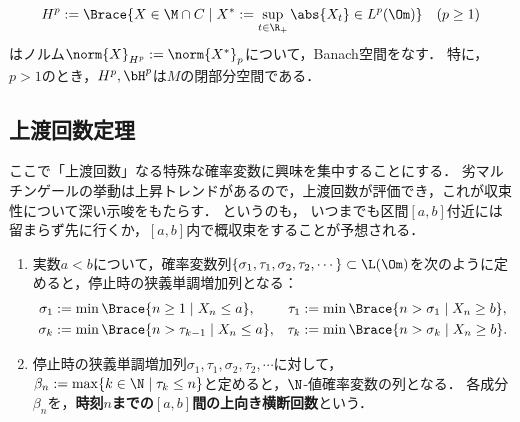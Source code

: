 \documentclass[uplatex,dvipdfmx]{jsreport}
\begin{document}
\begin{corollary}[可積分なマルチンゲールのなすBanach空間]\label{cor-the-space-Hp}
    \[H^p:=\Brace{X\in\M\cap C\mid X^*:=\sup_{t\in\R_+}\abs{X_t}\in L^p(\Om)}\quad(p\ge 1)\]
    はノルム$\norm{X}_{H^p}:=\norm{X^*}_p$について，Banach空間をなす．
    特に，$p>1$のとき，$H^p,\bH^p$は$M$の閉部分空間である．
\end{corollary}

\subsection{上渡回数定理}

\begin{tcolorbox}[colframe=ForestGreen, colback=ForestGreen!10!white,breakable,colbacktitle=ForestGreen!40!white,coltitle=black,fonttitle=\bfseries\sffamily,
    title=]
    ここで「上渡回数」なる特殊な確率変数に興味を集中することにする．
    劣マルチンゲールの挙動は上昇トレンドがあるので，上渡回数が評価でき，これが収束性について深い示唆をもたらす．
    というのも，
    いつまでも区間$[a,b]$付近には留まらず先に行くか，$[a,b]$内で概収束をすることが予想される．
\end{tcolorbox}

\begin{definition}\mbox{}
    \begin{enumerate}
        \item 実数$a<b$について，確率変数列$\{\sigma_1,\tau_1,\sigma_2,\tau_2,\cdots\}\subset\L(\Om)$を次のように定めると，停止時の狭義単調増加列となる：
        \begin{align*}
            \sigma_1&:=\min\Brace{n\ge 1\mid X_n\le a},&\tau_1&:=\min\Brace{n>\sigma_1\mid X_n\ge b},\\
            \sigma_{k}&:=\min\Brace{n>\tau_{k-1}\mid X_n\le a},&\tau_{k}&:=\min\Brace{n>\sigma_{k}\mid X_n\ge b}.
        \end{align*}
        \item 停止時の狭義単調増加列$\sigma_1,\tau_1,\sigma_2,\tau_2,\cdots$に対して，$\beta_n:=\max\{k\in\N\mid\tau_{k}\le n\}$と定めると，$\N$-値確率変数の列となる．
        各成分$\beta_n$を，\textbf{時刻$n$までの$[a,b]$間の上向き横断回数}という．
    \end{enumerate}
\end{definition}
\end{document}
